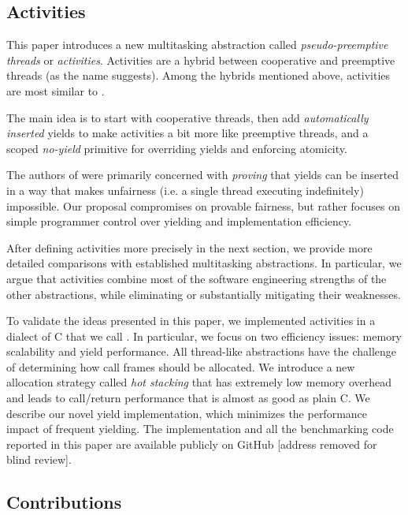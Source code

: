 \documentclass[pldi,10pt,preprint]{sigplanconf-pldi16}
\begin{document}
\subsection{Activities}

This paper introduces a new multitasking abstraction called \emph{pseudo-preemptive threads} or \emph{activities}.
Activities are a hybrid between cooperative and preemptive threads (as the name suggests).
Among the hybrids mentioned above, activities are most similar to \cite{Boudol2007}.

The main idea is to start with cooperative threads, then add \emph{automatically inserted} yields to make activities a bit more like preemptive threads, and a scoped \emph{no-yield} primitive for overriding yields and enforcing atomicity.

The authors of \cite{Boudol2007} were primarily concerned with \emph{proving} that yields can be inserted in a way that makes unfairness (i.e. a single thread executing indefinitely) impossible.
Our proposal compromises on provable fairness, but rather focuses on simple programmer control over yielding and implementation efficiency.

After defining activities more precisely in the next section, we provide more detailed comparisons with established multitasking abstractions.
In particular, we argue that activities combine most of the software engineering strengths of the other abstractions, while eliminating or substantially mitigating their weaknesses.

To validate the ideas presented in this paper, we implemented activities in a dialect of C that we call \charcoal{}.
In particular, we focus on two efficiency issues: memory scalability and yield performance.
All thread-like abstractions have the challenge of determining how call frames should be allocated.
We introduce a new allocation strategy called \emph{hot stacking} that has extremely low memory overhead and leads to call/return performance that is almost as good as plain C.
We describe our novel yield implementation, which minimizes the performance impact of frequent yielding.
The \charcoal{} implementation and all the benchmarking code reported in this paper are available publicly on GitHub [address removed for blind review].


\subsection{Contributions}
\end{document}

